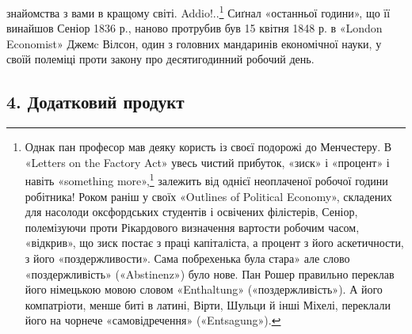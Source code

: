 \parcont{}  %
знайомства з вами в кращому світі. Addio!..\footnote{
Однак пан професор мав деяку користь із своєї подорожі до Менчестеру.
В «Letters on the Factory Act» увесь чистий прибуток, «зиск» і «процент» і
навіть «something more»,\footnote*{
— щось більше. \emph{Ред}.
} залежить від
однієї неоплаченої
робочої години робітника! Роком раніш у своїх «Outlines of Political Economy»,
складених для насолоди оксфордських студентів і освічених філістерів, Сеніор,
полемізуючи проти Рікардового визначення вартости робочим часом, «відкрив», що
зиск постає з праці капіталіста, а процент з його
аскетичности, з його «поздержливости». Сама побрехенька була стара» але слово
«поздержливість» («Abstinenz») було нове. Пан Рошер правильно переклав його
німецькою мовою словом «Enthaltung» («поздержливість»). А його компатріоти,
менше биті в латині, Вірти, Шульци
й інші Міхелі, переклали його на чорнече «самовідречення» («Entsagung»).
} Сиґнал «останньої години», що її винайшов Сеніор 1836 р., наново протрубив
був 15 квітня 1848 р. в «London Economist» Джемc Вілсон, один з головних
мандаринів економічної науки, у своїй полеміці проти
закону про десятигодинний робочий день.
\subsection{4. Додатковий продукт}

